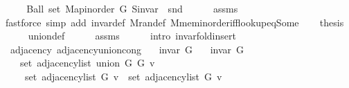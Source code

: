 \begin{isabellebody}
%
\isadelimproof
%
\endisadelimproof
%
\isatagproof
{}\isamarkupfalse%
\ {\isacharminus}{\kern0pt}\isanewline
\ \ \isamarkupfalse%
\ {\isachardoublequoteopen}Ball\ {\isacharparenleft}{\kern0pt}set\ {\isacharparenleft}{\kern0pt}Map{\isacharunderscore}{\kern0pt}inorder\ G{}{\isacharparenright}{\kern0pt}{\isacharparenright}{\kern0pt}\ {\isacharparenleft}{\kern0pt}S{\isachardot}{\kern0pt}invar\ {\isasymcirc}\ snd{\isacharparenright}{\kern0pt}{\isachardoublequoteclose}\isanewline
\ \ \ \ \isamarkupfalse%
\ assms{\isacharparenleft}{\kern0pt}{}{\isacharparenright}{\kern0pt}\isanewline
\ \ \ \ \isamarkupfalse%
\ {\isacharparenleft}{\kern0pt}fastforce\ simp\ add{\isacharcolon}{\kern0pt}\ invar{\isacharunderscore}{\kern0pt}def\ M{\isachardot}{\kern0pt}ran{\isacharunderscore}{\kern0pt}def\ M{\isachardot}{\kern0pt}mem{\isacharunderscore}{\kern0pt}inorder{\isacharunderscore}{\kern0pt}iff{\isacharunderscore}{\kern0pt}lookup{\isacharunderscore}{\kern0pt}eq{\isacharunderscore}{\kern0pt}Some{\isacharparenright}{\kern0pt}\isanewline
\ \ \isamarkupfalse%
\ {\isacharquery}{\kern0pt}thesis\isanewline
\ \ \ \ \isamarkupfalse%
\ union{\isacharunderscore}{\kern0pt}def\isanewline
\ \ \ \ \isamarkupfalse%
\ assms{\isacharparenleft}{\kern0pt}{}{\isacharparenright}{\kern0pt}\isanewline
\ \ \ \ \isamarkupfalse%
\ {\isacharparenleft}{\kern0pt}intro\ invar{\isacharunderscore}{\kern0pt}fold{\isacharunderscore}{\kern0pt}insert{\isacharunderscore}{\kern0pt}{}{\isacharparenright}{\kern0pt}\isanewline
{}\isamarkupfalse%
%
\endisatagproof
{\isafoldproof}%
%
\isadelimproof
\isanewline
%
\endisadelimproof
\isanewline
{}\isamarkupfalse%
\ {\isacharparenleft}{\kern0pt}\ adjacency{\isacharparenright}{\kern0pt}\ adjacency{\isacharunderscore}{\kern0pt}union{\isacharunderscore}{\kern0pt}cong{\isacharcolon}{\kern0pt}\isanewline
\ \ \ {\isachardoublequoteopen}invar\ G{}{\isachardoublequoteclose}\isanewline
\ \ \ {\isachardoublequoteopen}invar\ G{}{\isachardoublequoteclose}\isanewline
\ \ \isanewline
\ \ \ \ {\isachardoublequoteopen}set\ {\isacharparenleft}{\kern0pt}adjacency{\isacharunderscore}{\kern0pt}list\ {\isacharparenleft}{\kern0pt}union\ G{}\ G{}{\isacharparenright}{\kern0pt}\ v{\isacharparenright}{\kern0pt}\ {\isacharequal}{\kern0pt}\isanewline
\ \ \ \ \ set\ {\isacharparenleft}{\kern0pt}adjacency{\isacharunderscore}{\kern0pt}list\ G{}\ v{\isacharparenright}{\kern0pt}\ {\isasymunion}\ set\ {\isacharparenleft}{\kern0pt}adjacency{\isacharunderscore}{\kern0pt}list\ G{}\ v{\isacharparenright}{\kern0pt}{\isachardoublequoteclose}\isanewline

\end{isabellebody}
